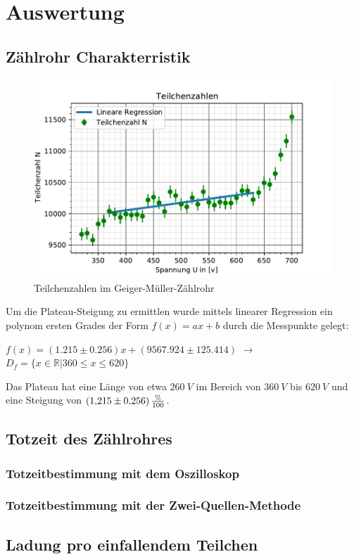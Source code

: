 \section{Auswertung}
\label{sec:auswertung}

\subsection{Zählrohr Charakterristik}
\label{sec:characteristik}

\begin{figure}
    \centering
    \includegraphics{kennlinie.pdf}
    \caption{Teilchenzahlen im Geiger-Müller-Zählrohr}
    \label{fig:teilchenzahl}
  \end{figure}
Um die Plateau-Steigung zu ermittlen wurde mittels linearer Regression ein polynom ersten Grades der 
Form $f(x)=ax+b$ durch die Messpunkte gelegt:
\begin{center}
    $f(x)=(1.215\pm0.256)x + (9567.924\pm125.414)$ $\rightarrow$ $D_f=\{x\in\mathbb{R} \vert 360\le x\le620\}$    
\end{center}
Das Plateau hat eine Länge von etwa $\SI{260}{V}$ im Bereich von $\SI{360}{V}$ bis $\SI{620}{V}$ und  eine 
Steigung von $\SI{1,215\pm0,256}{\frac{\%}{100}}$.
\subsection{Totzeit des Zählrohres}
\label{sec:totzeit}
\subsubsection{Totzeitbestimmung mit dem Oszilloskop}
\label{sec:totzeitO}
\subsubsection{Totzeitbestimmung mit der Zwei-Quellen-Methode}
\label{sec:totzeitZ}
\subsection{Ladung pro einfallendem Teilchen}
\label{sec:ladung}
